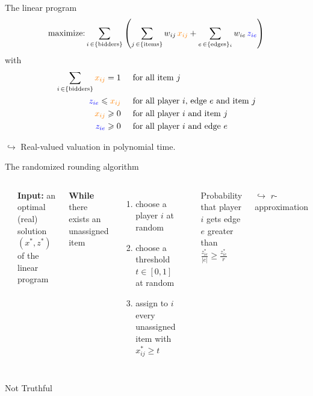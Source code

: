 \documentclass[aspectratio=169]{beamer}
\begin{document}
\begin{frame}{The linear program}
    \[
        \text{maximize:} \sum_{i \,\in \{\text{bidders}\}} \left(
        \sum_{j \,\in \{\text{items}\}} w_{ij}\, {\color{orange} x_{ij}}
        + \sum_{e \,\in \{\text{edges}\}_i} w_{ie}\, {\color{blue} z_{ie}}
        \right)
    \]
    with
    \begin{align*}
        \sum_{i \,\in \{\text{bidders}\}} {\color{orange} x_{ij}}  = 1 & \hspace{.5cm} \text{for all item \(j\)}                              \\
        {\color{blue} z_{ie}}  \leqslant {\color{orange} x_{ij}}       & \hspace{.5cm} \text{for all player \(i\), edge \(e\) and item \(j\)} \\
        {\color{orange} x_{ij}}   \geqslant 0                          & \hspace{.5cm} \text{for all player \(i\) and item \(j\)}             \\
        {\color{blue} z_{ie}}  \geqslant 0                             & \hspace{.5cm} \text{for all player \(i\) and edge \(e\)}
    \end{align*}

    $\hookrightarrow$ Real-valued valuation in \alert{polynomial time}.
\end{frame}

\begin{frame}{The randomized rounding algorithm}
    \begin{columns}
        \hrule
        \vspace{.1cm}
        \textbf{Input:} an optimal (real) solution \((x^*, z^*)\) of the linear program

        \vspace{.65cm}
        \textbf{While} there exists an unassigned item
        \begin{enumerate}
            \item choose a player \(i\) at random
            \item choose a threshold \(t \in [0, 1]\) at random
            \item assign to \(i\) every unassigned item with \(x_{ij}^* \geqslant t\)
        \end{enumerate}
        \hrule

        Probability that player \(i\) gets edge \(e\) greater than \(\frac{z_{ie}^*}{|e|} \geqslant \frac{z_{ie}^*}{r}\)

        \(\hookrightarrow\) \(r\)-approximation

    \end{columns}
    \pause
    \begin{center}
        \alert<2>{Not Truthful}
    \end{center}
\end{frame}
\end{document}
